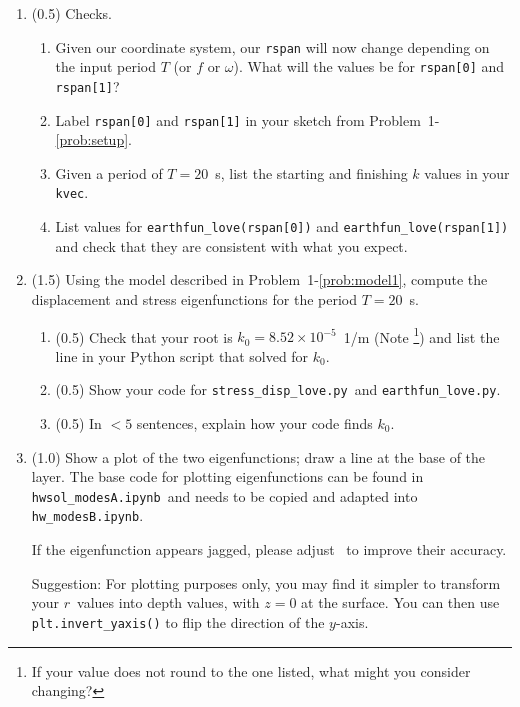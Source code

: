 \documentclass[11pt,titlepage,fleqn]{article}
\newcommand{\tfilemain}{{\tt hwsol\_modesA.ipynb}}
\newcommand{\tfilemainB}{{\tt hw\_modesB.ipynb}}
\newcommand{\tfilesdtB}{{\tt stress\_disp\_love.py}}
\newcommand{\tfileefB}{{\tt earthfun\_love.py}}
\begin{document}
\begin{enumerate}
\begin{enumerate}
\item (0.5) Checks.
%
\begin{enumerate}
\item Given our coordinate system, our \verb+rspan+ will now change depending on the input period $T$ (or $f$ or $\omega$). What will the values be for \verb+rspan[0]+ and \verb+rspan[1]+?

\item Label \verb+rspan[0]+ and \verb+rspan[1]+ in your sketch from Problem~1-\ref{prob:setup}.

\item Given a period of $T = 20$~s, list the starting and finishing $k$ values in your \verb+kvec+.

\item List values for \verb+earthfun_love(rspan[0])+ and \verb+earthfun_love(rspan[1])+ and check that they are consistent with what you expect.
\end{enumerate}

\item (1.5) Using the model described in Problem~1-\ref{prob:model1}, compute the displacement and stress eigenfunctions for the period $T = 20$~s.

\begin{enumerate}
\item (0.5) Check that your root is $k_0 = 8.52 \times 10^{-5}$~1/m (Note \footnote{If your value does not round to the one listed, what might you consider changing?}) and list the line in your Python script that solved for $k_0$.

\item (0.5) Show your code for \tfilesdtB\ and \tfileefB.

\item (0.5) In $<5$ sentences, explain how your code finds $k_0$.

\end{enumerate}

\item (1.0) Show a plot of the two eigenfunctions; draw a line at the base of the layer. The base code for plotting eigenfunctions can be found in \tfilemain\ and needs to be copied and adapted into \tfilemainB.

If the eigenfunction appears jagged, please adjust \maxstep\ to improve their accuracy.

Suggestion: For plotting purposes only, you may find it simpler to transform your $r$~values into depth values, with $z=0$ at the surface. You can then use \\ \verb+plt.invert_yaxis()+ to flip the direction of the $y$-axis.


\end{enumerate}
\end{enumerate}
\end{document}
